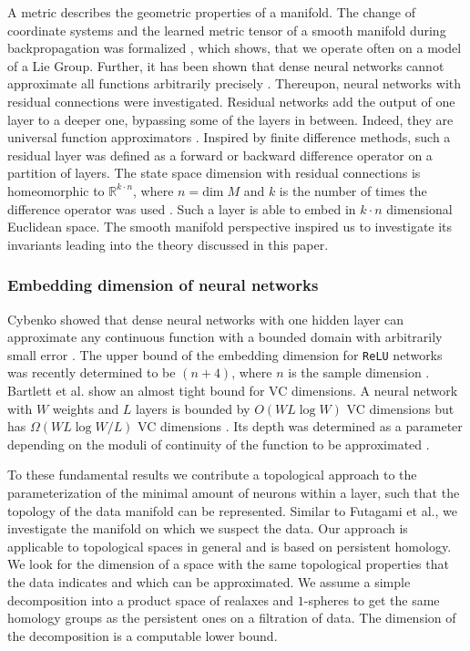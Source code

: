 \documentclass[runningheads,orivec]{llncs}
\begin{document}
A metric describes the geometric properties of a manifold. The change of coordinate systems and the learned metric tensor of a smooth manifold during backpropagation was formalized \cite{HauserR17}, which shows, that we operate often on a model of a Lie Group. Further, it has been shown that dense neural networks cannot approximate all functions arbitrarily precisely \cite{Johnson19}. Thereupon, neural networks with residual connections were investigated. Residual networks add the output of one layer to a deeper one, bypassing some of the layers in between. Indeed, they are universal function approximators \cite{LinJ18}. Inspired by finite difference methods, such a residual layer was defined as a forward or backward difference operator on a partition of layers. The state space dimension with residual connections is homeomorphic to $\mathbb{R}^{k \cdot n}$, where $n = \text{dim} \; M$ and $k$ is the number of times the difference operator was used \cite{HauserGJR19}. Such a layer is able to embed in $k\cdot n$ dimensional Euclidean space. The smooth manifold perspective inspired us to investigate its invariants leading into the theory discussed in this paper.

\subsubsection*{Embedding dimension of neural networks} Cybenko showed that dense neural networks with one hidden layer can approximate any continuous function with a bounded domain with arbitrarily small error \cite{Cybenko92}. The upper bound of the embedding dimension for \texttt{ReLU} networks was recently determined to be $(n+4)$, where $n$ is the sample dimension \cite{RaghuPKGS17}. Bartlett et al. show an almost tight bound for VC dimensions. A neural network with $W$ weights and $L$ layers is bounded by $O(WL \log W)$ VC dimensions but has $\Omega(WL \log W/L)$ VC dimensions \cite{BartlettHLM19}. Its depth was determined as a parameter depending on the moduli of continuity of the function to be approximated \cite{LinJ18}. 

To these fundamental results we contribute a topological approach to the parameterization of the minimal amount of neurons within a layer, such that the topology of the data manifold can be represented. Similar to Futagami et al.\cite{FutagamiYS19}, we investigate the manifold on which we suspect the data. Our approach is applicable to topological spaces in general and is based on persistent homology. We look for the dimension of a space with the same topological properties that the data indicates and which can be approximated. We assume a simple decomposition into a product space of realaxes and $1$-spheres to get the same homology groups as the persistent ones on a filtration of data. The dimension of the decomposition is a computable lower bound.
\end{document}
